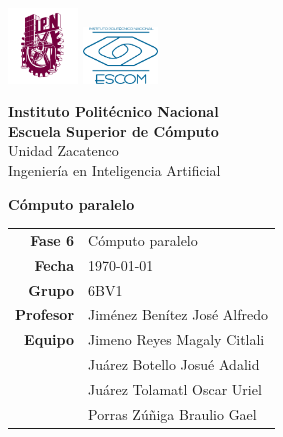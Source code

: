 \begin{titlepage}
	\centering
	\includegraphics[height=2cm]{logo/Logo_IPN.png}
	\hfill
	\raisebox{0.25\height}
	{\includegraphics[height=1.5cm]{logo/escudoESCOM.png}}

	\vspace{-1.5cm}
	\large\textbf{Instituto Politécnico Nacional}\\
	\large\textbf{Escuela Superior de Cómputo}\\
	\large{Unidad Zacatenco}\\
	\vspace{0.5cm}
	\large{{Ingeniería en Inteligencia Artificial}}
	\vspace{2cm}


	\Large{\textbf{Cómputo paralelo}}

	\vspace{8cm}

	\begin{tabular}{rl}
		\textbf{Fase 6}  & Cómputo paralelo
		                   \\
		\textbf{Fecha} & \today \\
		\textbf{Grupo}    & 6BV1                        \\
		\textbf{Profesor} & Jiménez Benítez José Alfredo \\
		\textbf{Equipo}   
		& Jimeno Reyes Magaly Citlali \\
		& Juárez Botello Josué Adalid \\
		& Juárez Tolamatl Oscar Uriel \\
		& Porras Zúñiga Braulio Gael \\
	\end{tabular}
\end{titlepage}
